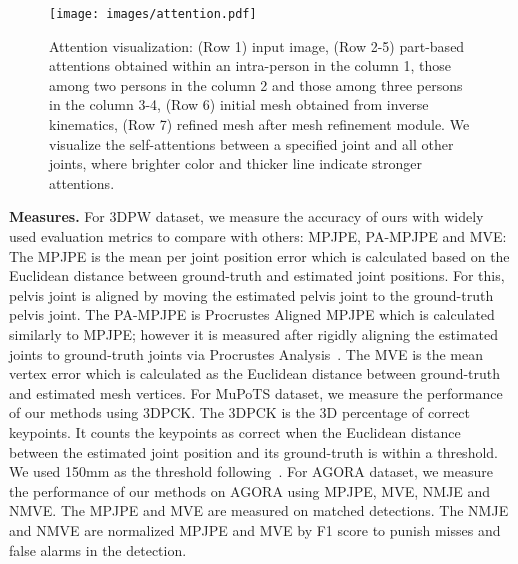 \documentclass[runningheads]{llncs}
\begin{document}
\begin{table}[t]
\captionsetup{font=scriptsize}
\centering
\caption{Ablation study of the effectiveness of IK, refiner, positional embedding, masking input patch and comparison between the different number of Transformer's input persons on 3DPW.}
\label{tab:ablation study}
\end{table}

\begin{figure*}[ht!]
\centering
\texttt{[image: images/attention.pdf]}
\caption{Attention visualization: (Row 1) input image, (Row 2-5) part-based attentions obtained within an intra-person in the column 1, those among two persons in the column 2 and those among three persons in the column 3-4, (Row 6) initial mesh obtained from inverse kinematics, (Row 7) refined mesh after mesh refinement module. We visualize the self-attentions between a specified joint and all other joints, where brighter color and thicker line indicate stronger attentions.}
\label{attention}
\end{figure*}

\noindent \textbf{Measures.} For 3DPW dataset, we measure the accuracy of ours with widely used evaluation metrics to compare with others: MPJPE, PA-MPJPE and MVE: The MPJPE is the mean per joint position error which is calculated based on the Euclidean distance between ground-truth and estimated joint positions. For this, pelvis joint is aligned by moving the estimated pelvis joint to the ground-truth pelvis joint. The PA-MPJPE is Procrustes Aligned MPJPE which is calculated similarly to MPJPE; however it is measured after rigidly aligning the estimated joints to ground-truth joints via Procrustes Analysis~\cite{gower1975generalized}. The MVE is the mean vertex error which is calculated as the Euclidean distance between ground-truth and estimated mesh vertices. For MuPoTS dataset, we measure the performance of our methods using 3DPCK. The 3DPCK is the 3D percentage of correct keypoints. It counts the keypoints as correct when the Euclidean distance between the estimated joint position and its ground-truth is within a threshold. We used 150mm as the threshold following~\cite{moon2019camera}. For AGORA dataset, we measure the performance of our methods on AGORA using MPJPE, MVE, NMJE and NMVE. The MPJPE and MVE are measured on matched detections. The NMJE and NMVE are normalized MPJPE and MVE by F1 score to punish misses and false alarms in the detection.
\end{document}
